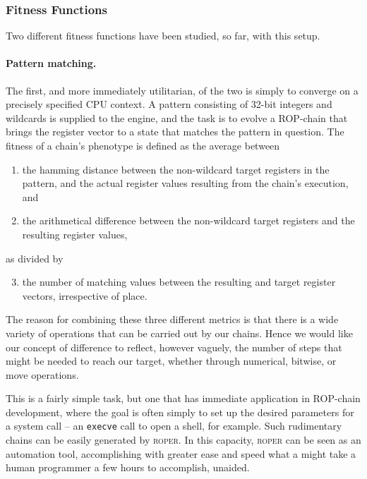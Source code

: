 \subsubsection{Fitness Functions}

Two different fitness functions have been studied, so far, with
this setup. 

\paragraph{Pattern matching.} The first, and more immediately
utilitarian, of the two is simply to converge on a precisely
specified CPU context. A pattern consisting of 32-bit
integers and wildcards is supplied to the engine, and the task is
to evolve a ROP-chain that brings the register vector to
a state that matches the pattern in question. The fitness of a
chain's phenotype is defined as the average between
{\small
\begin{enumerate}
  
  \item the hamming distance between the non-wildcard target
    registers in the pattern, and the actual register values
    resulting from the chain's execution, and
  
  \item the arithmetical difference between the non-wildcard
    target registers and the resulting register values,

\end{enumerate} 
}
as divided by 
{\small
\begin{enumerate}
    \setcounter{enumi}{2}
  \item the number of matching values between the resulting
and target register vectors, irrespective of place.
\end{enumerate}
}
The reason
for combining these three different metrics is that there is a
wide variety of operations that can be carried out by our chains.
Hence we would like our concept of difference to reflect,
however vaguely, the number of steps that might be needed to
reach our target, whether through numerical, bitwise, or move
operations.

This is a fairly simple task, but one that has immediate
application in ROP-chain development, where the goal is
often simply to set up the desired parameters for a system call
-- an \texttt{execve} call to open a shell, for example. Such
rudimentary chains can be easily generated by \textsc{roper}. 
In this capacity, \textsc{roper} can be seen as an automation
tool, accomplishing with greater ease and speed what a might take
a human programmer a few hours to accomplish, unaided. 

